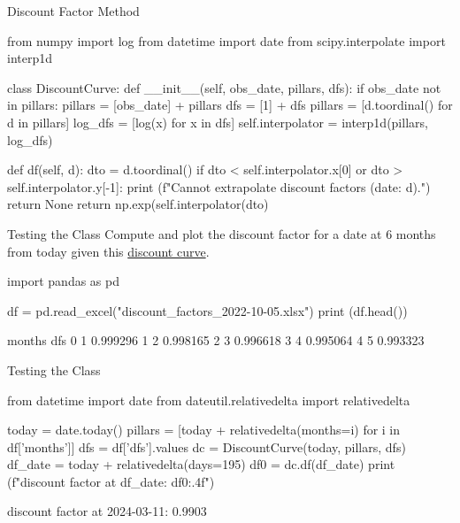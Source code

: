 \documentclass{beamer}
\begin{document}
\begin{frame}[fragile]{Discount Factor Method}
\begin{ipython}
from numpy import log
from datetime import date
from scipy.interpolate import interp1d  
	
class DiscountCurve:
    def __init__(self, obs_date, pillars, dfs):
        if obs_date not in pillars:
            pillars = [obs_date] + pillars
            dfs = [1] + dfs
        pillars = [d.toordinal() for d in pillars]
        log_dfs = [log(x) for x in dfs]
        self.interpolator = interp1d(pillars, log_dfs)
        
  def df(self, d):
    dto = d.toordinal()   
    if dto < self.interpolator.x[0] or dto > self.interpolator.y[-1]:
      print (f"Cannot extrapolate discount factors (date: {d}).")
      return None
    return np.exp(self.interpolator(dto)
\end{ipython}
\end{frame}

\begin{frame}[fragile]{Testing the Class}
Compute and plot the discount factor for a date at 6 months from today given this \href{https://github.com/matteosan1/finance_course/raw/develop/input_files/discount_factors_2022-10-05.xlsx}{discount curve}.
\begin{ipython}
import pandas as pd

df = pd.read_excel("discount_factors_2022-10-05.xlsx")
print (df.head())
\end{ipython}
\begin{ioutput}
   months       dfs
0       1  0.999296
1       2  0.998165
2       3  0.996618
3       4  0.995064
4       5  0.993323
\end{ioutput}
\end{frame}

\begin{frame}[fragile]{Testing the Class}
\begin{ipython}
from datetime import date
from dateutil.relativedelta import relativedelta

today = date.today()
pillars = [today + relativedelta(months=i) for i in df['months']]
dfs = df['dfs'].values
dc = DiscountCurve(today, pillars, dfs)
df_date = today + relativedelta(days=195)
df0 = dc.df(df_date)
print (f"discount factor at {df_date}: {df0:.4f}")
\end{ipython}
\begin{ioutput}
discount factor at 2024-03-11: 0.9903
\end{ioutput}
\end{frame}
\end{document}
